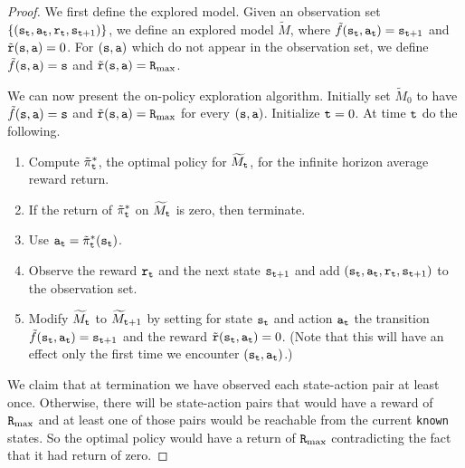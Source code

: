\begin{proof}
We first define the explored model. Given an observation set
$\{({\tt s}_{\tt t},{\tt a}_{\tt t} ,{\tt r}_{\tt t},
{\tt s}_{{\tt t}+1})\}$, we define an explored model $\widetilde{M}$,
where $\tilde{f}({\tt s}_{\tt t},{\tt a}_{\tt t})={\tt s}_{{\tt t}+1}$
and $\tilde{{\tt r}}({\tt s},{\tt a})=0$.
%
For $({\tt s},{\tt a})$ which do not appear in the observation set,
we define $\tilde{f}({\tt s},{\tt a})={\tt s}$ and
$\tilde{{\tt r}}({\tt s},{\tt a})={\tt R}_{\max }$.


We can now present the on-policy exploration algorithm. Initially
set $\widetilde{M}_0$ to have $\tilde{f}({\tt s},{\tt a})={\tt s}$ and
$\tilde{{\tt r}}({\tt s},{\tt a})={\tt R}_{\max }$ for every $({\tt s},{\tt a})$. Initialize ${\tt t}=0$. At
time ${\tt t}$ do the following.
\begin{enumerate}
\item
Compute $\tilde{\pi}^*_{\tt t}$, the optimal policy for
$\widetilde{M}_{\tt t}$, for the infinite horizon average reward return.
\item
If the return of $\tilde{\pi}^*_{\tt t}$ on $\widetilde{M}_{\tt t}$ is
zero, then terminate.
\item
Use ${\tt a}_{\tt t}=\tilde{\pi}^*_{\tt t}({\tt s}_{{\tt t}})$.
\item
Observe the reward ${\tt r}_{\tt t}$ and the next state
${\tt s}_{{\tt t}+1}$ and add
$({\tt s}_{\tt t},{\tt a}_{\tt t},{\tt r}_{\tt t},{\tt s}_{{\tt t}+1})$ to
the observation set.
\item
Modify $\widetilde{M}_{\tt t}$ to  $\widetilde{M}_{{\tt t}+1}$
by setting for state ${\tt s}_{\tt t}$ and action ${\tt a}_{\tt t}$ the
transition $\tilde{f}({\tt s}_{\tt t},{\tt a}_{\tt t})={\tt s}_{{\tt t}+1}$
and the reward $\tilde{{\tt r}}({\tt s}_{\tt t},{\tt a}_{\tt t})=0$.
(Note that this will have an effect only the first time we encounter
$({\tt s}_{\tt t},{\tt a}_{\tt t})$.)
\end{enumerate}

We claim that at termination we have observed each state-action pair
at least once. Otherwise, there will be state-action pairs that
would have a reward of ${\tt R}_{\max }$ and at least one of those pairs would
be reachable from the current \texttt{known} states. So the optimal policy
would have a return of ${\tt R}_{\max }$ contradicting the fact that it had
return of zero.


\end{proof}
